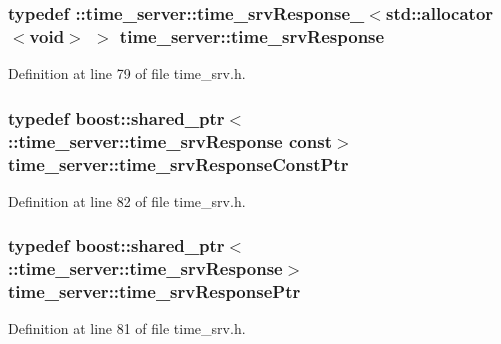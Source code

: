 \subsubsection[{time\-\_\-srv\-Response}]{\setlength{\rightskip}{0pt plus 5cm}typedef \-::{\bf time\-\_\-server\-::time\-\_\-srv\-Response\-\_\-}$<$std\-::allocator$<$void$>$ $>$ {\bf time\-\_\-server\-::time\-\_\-srv\-Response}}\label{namespacetime__server_a8135289f84cef17b8bf9fce102168a55}


\-Definition at line 79 of file time\-\_\-srv.\-h.

\subsubsection[{time\-\_\-srv\-Response\-Const\-Ptr}]{\setlength{\rightskip}{0pt plus 5cm}typedef boost\-::shared\-\_\-ptr$<$ \-::{\bf time\-\_\-server\-::time\-\_\-srv\-Response} const$>$ {\bf time\-\_\-server\-::time\-\_\-srv\-Response\-Const\-Ptr}}\label{namespacetime__server_a4942bfe100f512d82e96d5a9daa31c5c}


\-Definition at line 82 of file time\-\_\-srv.\-h.

\subsubsection[{time\-\_\-srv\-Response\-Ptr}]{\setlength{\rightskip}{0pt plus 5cm}typedef boost\-::shared\-\_\-ptr$<$ \-::{\bf time\-\_\-server\-::time\-\_\-srv\-Response}$>$ {\bf time\-\_\-server\-::time\-\_\-srv\-Response\-Ptr}}\label{namespacetime__server_a18998a5604fbd73053a4bd772550190f}


\-Definition at line 81 of file time\-\_\-srv.\-h.

